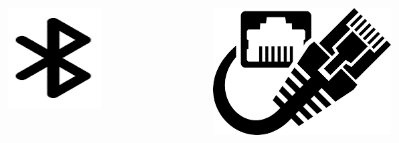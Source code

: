 \documentclass[aspectratio=169,
				xcolor=table]{beamer}
\begin{document}
\begin{frame}
\begin{columns}
\begin{column}{0.23\textwidth}
\begin{figure}
					\includegraphics[width=0.9\textwidth, keepaspectratio]{../figs/cap03/bluetooth} 			
				\end{figure}
			\end{column}
			\begin{column}{0.23\textwidth}
				\begin{figure}
					\centering
					\includegraphics[width=0.9\textwidth, keepaspectratio]{../figs/cap03/ethernet} 			
				\end{figure}
			\end{column}
			\begin{column}{0.23\textwidth}

\end{column}
\end{columns}
\end{frame}
\end{document}
